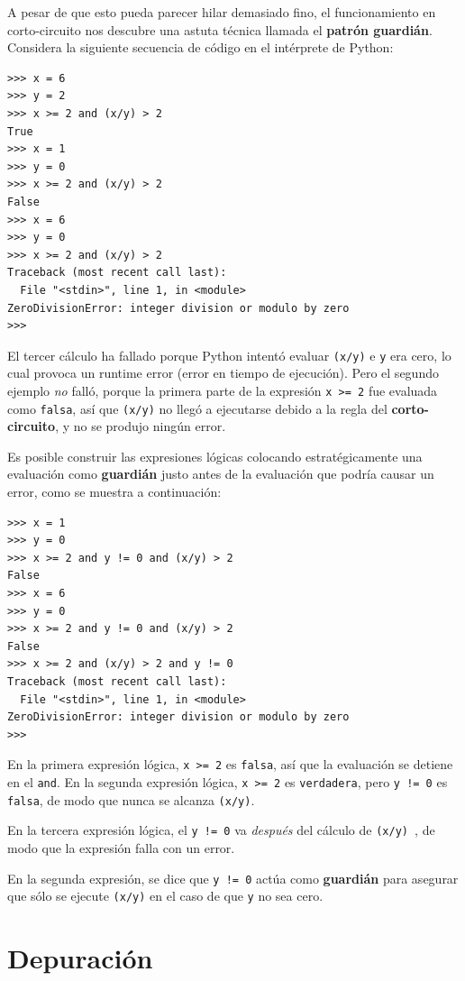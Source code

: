 A pesar de que esto pueda parecer hilar demasiado fino, el funcionamiento
en corto-circuito nos descubre una astuta técnica llamada el {\bf patrón guardián}.
Considera la siguiente secuencia de código en el intérprete de Python:

\beforeverb
\begin{verbatim}
>>> x = 6 
>>> y = 2
>>> x >= 2 and (x/y) > 2
True
>>> x = 1 
>>> y = 0
>>> x >= 2 and (x/y) > 2
False
>>> x = 6
>>> y = 0
>>> x >= 2 and (x/y) > 2
Traceback (most recent call last):
  File "<stdin>", line 1, in <module>
ZeroDivisionError: integer division or modulo by zero
>>> 
\end{verbatim}
\afterverb
%
El tercer cálculo ha fallado porque Python intentó evaluar {\tt (x/y)}
e {\tt y} era cero, lo cual provoca un runtime error (error en tiempo de ejecución). Pero el segundo
ejemplo \emph{no} falló, porque la primera parte de la expresión {\tt x >= 2}
fue evaluada como {\tt falsa}, así que {\tt (x/y)} no llegó a ejecutarse
debido a la regla del {\bf corto-circuito}, y no se produjo ningún error.

Es posible construir las expresiones lógicas colocando estratégicamente una
evaluación como {\bf guardián} justo antes de la evaluación que podría causar un error,
como se muestra a continuación:

\beforeverb
\begin{verbatim}
>>> x = 1
>>> y = 0
>>> x >= 2 and y != 0 and (x/y) > 2
False
>>> x = 6 
>>> y = 0
>>> x >= 2 and y != 0 and (x/y) > 2
False
>>> x >= 2 and (x/y) > 2 and y != 0
Traceback (most recent call last):
  File "<stdin>", line 1, in <module>
ZeroDivisionError: integer division or modulo by zero
>>>
\end{verbatim}
\afterverb
%
En la primera expresión lógica, {\tt x >= 2} es {\tt falsa}, así que la evaluación
se detiene en el {\tt and}. En la segunda expresión lógica, {\tt x >= 2} es {\tt verdadera},
pero {\tt y != 0} es {\tt falsa}, de modo que nunca se alcanza {\tt (x/y)}.

En la tercera expresión lógica, el {\tt y != 0} va \emph{después} del
cálculo de {\tt (x/y) }, de modo que la expresión falla con un error.

En la segunda expresión, se dice que {\tt y != 0} actúa como {\bf guardián}
para asegurar que sólo se ejecute {\tt (x/y)} en el caso de que {\tt y} no sea cero.


\section{Depuración}
\label{whitespace}

